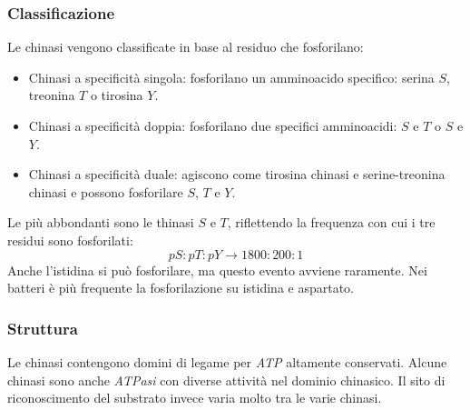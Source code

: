 		\subsubsection{Classificazione}
		Le chinasi vengono classificate in base al residuo che fosforilano:
		\begin{itemize}
			\item Chinasi a specificit\`a singola: fosforilano un amminoacido specifico: serina $S$, treonina $T$ o tirosina $Y$.
			\item Chinasi a specificit\`a doppia: fosforilano due specifici amminoacidi: $S$ e $T$ o $S$ e $Y$.
			\item Chinasi a specificit\`a duale: agiscono come tirosina chinasi e serine-treonina chinasi e possono fosforilare $S$, $T$ e $Y$.
		\end{itemize}
		Le pi\`u abbondanti sono le thinasi $S$ e $T$, riflettendo la frequenza con cui i tre residui sono fosforilati: 
		\[pS:pT:pY\rightarrow 1800:200:1\]
		Anche l'istidina si pu\`o fosforilare, ma questo evento avviene raramente. 
		Nei batteri \`e pi\`u frequente la fosforilazione su istidina e aspartato. 
		\subsubsection{Struttura}
		Le chinasi contengono domini di legame per \emph{ATP} altamente conservati.
		Alcune chinasi sono anche \emph{ATPasi} con diverse attivit\`a nel dominio chinasico. 
		Il sito di riconoscimento del substrato invece varia molto tra le varie chinasi. 

